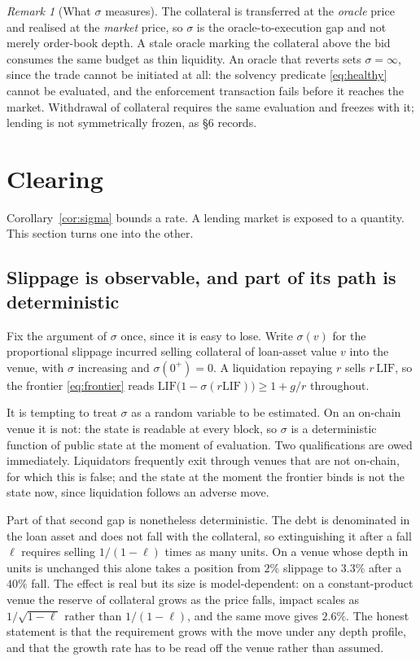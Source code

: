 \documentclass[11pt,a4paper]{article}
\theoremstyle{plain}
\theoremstyle{definition}
\theoremstyle{remark}
\newtheorem{remark}[proposition]{Remark}
\newcommand{\LIF}{\mathrm{LIF}}
\begin{document}
\begin{remark}[What $\sigma$ measures]
The collateral is transferred at the \emph{oracle} price and realised at the \emph{market} price,
so $\sigma$ is the oracle-to-execution gap and not merely order-book depth. A stale oracle
marking the collateral above the bid consumes the same budget as thin liquidity. An oracle that
reverts sets $\sigma=\infty$, since the trade cannot be initiated at all: the solvency predicate
\eqref{eq:healthy} cannot be evaluated, and the enforcement transaction fails before it reaches
the market. Withdrawal of collateral requires the same evaluation and freezes with it; lending is
not symmetrically frozen, as \S6 records.
\end{remark}

\section{Clearing}

Corollary~\ref{cor:sigma} bounds a rate. A lending market is exposed to a quantity. This section
turns one into the other.

\subsection{Slippage is observable, and part of its path is deterministic}

Fix the argument of $\sigma$ once, since it is easy to lose. Write $\sigma(v)$ for the
proportional slippage incurred selling collateral of loan-asset value $v$ into the venue, with
$\sigma$ increasing and $\sigma(0^{+})=0$. A liquidation repaying $r$ sells $r\,\LIF$, so the
frontier \eqref{eq:frontier} reads $\LIF\bigl(1-\sigma(r\LIF)\bigr)\geq 1+g/r$ throughout.

It is tempting to treat $\sigma$ as a random variable to be estimated. On an on-chain venue it is
not: the state is readable at every block, so $\sigma$ is a deterministic function of public
state at the moment of evaluation. Two qualifications are owed immediately. Liquidators
frequently exit through venues that are not on-chain, for which this is false; and the state at
the moment the frontier binds is not the state now, since liquidation follows an adverse move.

Part of that second gap is nonetheless deterministic. The debt is denominated in the loan asset
and does not fall with the collateral, so extinguishing it after a fall $\ell$ requires selling
$1/(1-\ell)$ times as many units. On a venue whose depth in units is unchanged this alone takes a
position from $2\%$ slippage to $3.3\%$ after a $40\%$ fall. The effect is real but its size is
model-dependent: on a constant-product venue the reserve of collateral grows as the price falls,
impact scales as $1/\sqrt{1-\ell}$ rather than $1/(1-\ell)$, and the same move gives $2.6\%$. The
honest statement is that the requirement grows with the move under any depth profile, and that
the growth rate has to be read off the venue rather than assumed.
\end{document}
